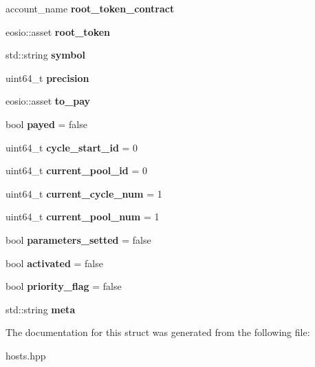 \begin{DoxyCompactItemize}
account\+\_\+name {\bfseries root\+\_\+token\+\_\+contract}
\item 
\mbox{\label{structeosio_1_1hosts_afa179770d2e8a88d7293e6944444c11f}} 
eosio\+::asset {\bfseries root\+\_\+token}
\item 
\mbox{\label{structeosio_1_1hosts_ae2c9510a9ce759db7d2aeae3faf647be}} 
std\+::string {\bfseries symbol}
\item 
\mbox{\label{structeosio_1_1hosts_a4c749457bfde265a0d7a753c709c0143}} 
uint64\+\_\+t {\bfseries precision}
\item 
\mbox{\label{structeosio_1_1hosts_ab4e6f3ba589eaadd478d5f323fb400e9}} 
eosio\+::asset {\bfseries to\+\_\+pay}
\item 
\mbox{\label{structeosio_1_1hosts_aea4d9c0e1b7cc09a370beebe8a722e9d}} 
bool {\bfseries payed} = false
\item 
\mbox{\label{structeosio_1_1hosts_a55fffc66db7d0c7b41dc3196e01881e4}} 
uint64\+\_\+t {\bfseries cycle\+\_\+start\+\_\+id} = 0
\item 
\mbox{\label{structeosio_1_1hosts_a7399a51fe112259457f6806fd67facdd}} 
uint64\+\_\+t {\bfseries current\+\_\+pool\+\_\+id} = 0
\item 
\mbox{\label{structeosio_1_1hosts_abea7dfb95114c372782e766e0af6c0af}} 
uint64\+\_\+t {\bfseries current\+\_\+cycle\+\_\+num} = 1
\item 
\mbox{\label{structeosio_1_1hosts_a5810fa9639741a1ce1902e95e762b199}} 
uint64\+\_\+t {\bfseries current\+\_\+pool\+\_\+num} = 1
\item 
\mbox{\label{structeosio_1_1hosts_a2511194c72da4334310ff0e072cc8c73}} 
bool {\bfseries parameters\+\_\+setted} = false
\item 
\mbox{\label{structeosio_1_1hosts_a626968c302110de0c917f2069c9da098}} 
bool {\bfseries activated} = false
\item 
\mbox{\label{structeosio_1_1hosts_a6091be9270841cdbe0211b78be03bd1f}} 
bool {\bfseries priority\+\_\+flag} = false
\item 
\mbox{\label{structeosio_1_1hosts_a788e65f4a5cf1d6cfeb659c7b5d0afcc}} 
std\+::string {\bfseries meta}
\end{DoxyCompactItemize}


The documentation for this struct was generated from the following file\+:\begin{DoxyCompactItemize}
\item 
hosts.\+hpp\end{DoxyCompactItemize}
